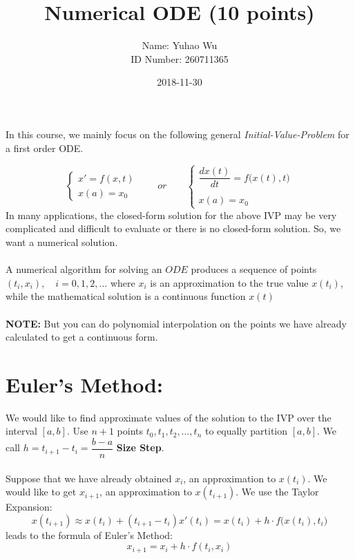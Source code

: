 \documentclass [9 pt]{article}
\theoremstyle{definition}
\begin{document}
\title{Numerical ODE (10 points)}
\date{2018-11-30}
\author{Name: Yuhao Wu\\
ID Number: 260711365
}
\maketitle



In this course, we mainly focus on the following general \textit{Initial-Value-Problem} for a first order ODE.

$$ \begin{cases}
	x' = f(x, t)\\
	x(a) = x_0
\end{cases} \quad \quad or \quad \quad 
\begin{cases}
	\dfrac{dx(t)}{dt} = f\Big(x(t), t\Big)\\
	\\
	x(a) = x_0
\end{cases}
$$
In many applications, the closed-form solution for the above IVP may be very complicated and difficult to evaluate or there is no closed-form solution. So, we want a numerical solution.\\
\\
A numerical algorithm for solving an $ODE$ produces a sequence of points $(t_i, x_i), \quad i = 0, 1, 2, \ldots$ where $x_i$ is an approximation to the true value $x(t_i)$, while the mathematical solution is a continuous function $x(t)$\\
\\
\textbf{NOTE:} But you can do polynomial interpolation on the points we have already calculated to get a continuous form.


\section*{Euler's Method:}
We would like to find approximate values of the solution to the IVP over the interval $[a, b]$. Use $n + 1$ points $t_0, t_1, t_2, \ldots , t_n$ to equally partition $[a, b]$. We call $h = t_{i+1} - t_i = \dfrac{b - a}{n}$ \textbf{Size Step}.\\
\\
Suppose that we have already obtained $x_i$, an approximation to $x(t_i)$. We would like to get $x_{i+1}$, an approximation to $x(t_{i+1})$. We use the Taylor Expansion:
$$x(t_{i + 1}) \approx x(t_i) + (t_{i + 1} - t_i)x'(t_i) = x(t_i) + h \cdot f\Big( x(t_i), t_i \Big) $$
leads to the formula of Euler's Method:
$$ x_{i+1} = x_i + h \cdot f(t_i, x_i) $$
\end{document}
